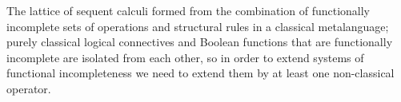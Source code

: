 





\usepackage[utf8]{inputenc}


















































The lattice of sequent calculi formed from the combination of functionally incomplete sets of operations and structural rules in a classical metalanguage; purely classical logical connectives and Boolean functions that are functionally incomplete are isolated from each other, so in order to extend systems of functional incompleteness we need to extend them by at least one non-classical operator.


